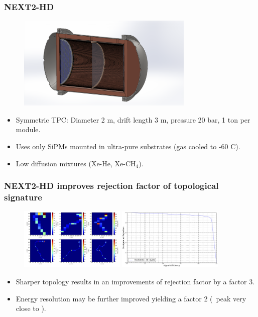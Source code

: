 \begin{frame}
\frametitle{NEXT2-HD}

\begin{figure}[tbh!]
  \begin{center}
      \includegraphics[width=0.75\textwidth]{moriond/next2.png}   
  \end{center}
\end{figure}

\begin{itemize}
\item Symmetric TPC: Diameter 2 m, drift length 3 m, pressure 20 bar, 1 ton per module.  
\item Uses only SiPMs mounted in ultra-pure substrates (gas cooled to -60 C).
  \item Low diffusion mixtures (Xe-He, Xe-CH$_4$). 
\end{itemize}
\end{frame}

\begin{frame}
\frametitle{NEXT2-HD improves rejection factor of topological signature}
\begin{figure}[tbh!]
  \begin{center}
      \includegraphics[width=0.45\textwidth]{moriond/high-low-diff-tracks.png}
       \includegraphics[width=0.45\textwidth]{moriond/signal-bkg-lowdiff-nn.png}
  \end{center}
 \end{figure}
 
 \begin{itemize}
\item Sharper topology results in an improvements of rejection factor by a factor 3.
\item Energy resolution may be further improved yielding a factor 2 (\BI\ peak very close to \Qbb).   
\end{itemize}
\end{frame} 

